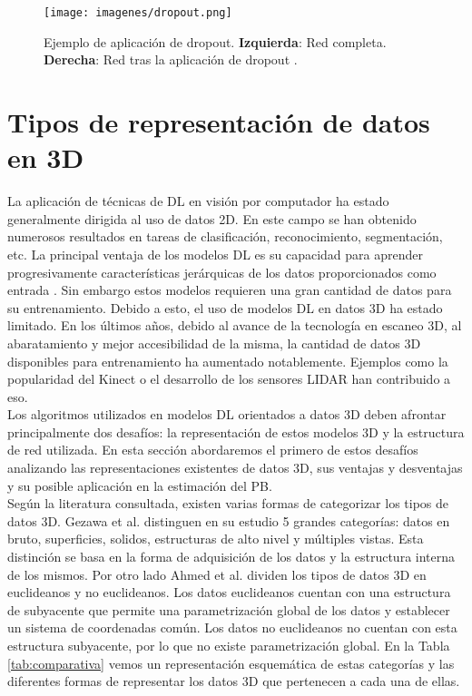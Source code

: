 \begin{figure}[ht!]
    \centering
    \texttt{[image: imagenes/dropout.png]}
    \caption[Ejemplo de aplicación de dropout.]{Ejemplo de aplicación de dropout. \textbf{Izquierda}: Red completa. \textbf{Derecha}: Red tras la aplicación de dropout \cite{budhiraja_2018}.}
    \label{fig:dropout}
\end{figure}

\section{Tipos de representación de datos en 3D}
\label{sec:datos3d}

La aplicación de técnicas de DL en visión por computador ha estado generalmente dirigida al uso de datos 2D. En este campo se han obtenido numerosos resultados en tareas de clasificación, reconocimiento, segmentación, etc. La principal ventaja de los modelos DL es su capacidad para aprender progresivamente características jerárquicas de los datos proporcionados como entrada \cite{krizhevsky2012imagenet}. Sin embargo estos modelos requieren una gran cantidad de datos para su entrenamiento. Debido a esto, el uso de modelos DL en datos 3D ha estado limitado. En los últimos años, debido al avance de la tecnología en escaneo 3D, al abaratamiento y mejor accesibilidad de la misma, la cantidad de datos 3D disponibles para entrenamiento ha aumentado notablemente. Ejemplos como la popularidad del Kinect o el desarrollo de los sensores LIDAR han contribuido a eso.
\\

Los algoritmos utilizados en modelos DL orientados a datos 3D deben afrontar principalmente dos desafíos: la representación de estos modelos 3D y la estructura de red utilizada. En esta sección abordaremos el primero de estos desafíos analizando las representaciones existentes de datos 3D, sus ventajas y desventajas y su posible aplicación en la estimación del PB.
\\

Según la literatura consultada, existen varias formas de categorizar los tipos de datos 3D. Gezawa et al. \cite{gezawa2020review} distinguen en su estudio 5 grandes categorías: datos en bruto, superficies, solidos, estructuras de alto nivel y múltiples vistas. Esta distinción se basa en la forma de adquisición de los datos y la estructura interna de los mismos. Por otro lado Ahmed et al. \cite{ahmed2018survey} dividen los tipos de datos 3D en euclideanos y no euclideanos. Los datos euclideanos cuentan con una estructura de  subyacente que permite una parametrización global de los datos y establecer un sistema de coordenadas común. Los datos no euclideanos no cuentan con esta estructura subyacente, por lo que no existe parametrización global. En la Tabla \ref{tab:comparativa} vemos un representación esquemática de estas categorías y las diferentes formas de representar los datos 3D que pertenecen a cada una de ellas.
\\

